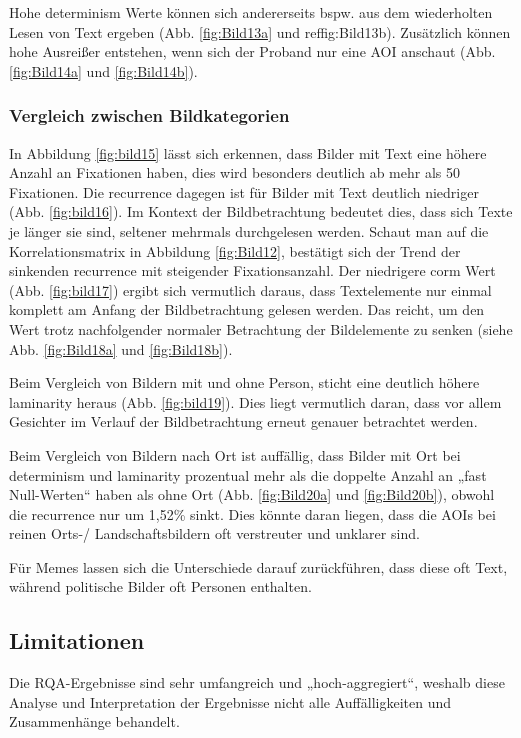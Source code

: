 \documentclass[
    language=german, %
    thesis=seminar, %
    supervisor=postdoc, %
    multiauthor=true, %
    ]{settings/csssa-thesis}
\begin{document}
Hohe determinism Werte können sich andererseits bspw. 
aus dem wiederholten Lesen von Text ergeben (Abb. \ref{fig:Bild13a} und ref{fig:Bild13b}). 
Zusätzlich können hohe Ausreißer entstehen, wenn sich der Proband nur eine AOI anschaut (Abb. \ref{fig:Bild14a} und \ref{fig:Bild14b}). 

\subsubsection{Vergleich zwischen Bildkategorien}
In Abbildung \ref{fig:bild15} lässt sich erkennen, dass Bilder mit Text eine höhere Anzahl an Fixationen haben, 
dies wird besonders deutlich ab mehr als 50 Fixationen. 
Die recurrence dagegen ist für Bilder mit Text deutlich niedriger (Abb. \ref{fig:bild16}). 
Im Kontext der Bildbetrachtung bedeutet dies, dass sich Texte je länger sie sind, 
seltener mehrmals durchgelesen werden.  Schaut man auf die Korrelationsmatrix in Abbildung \ref{fig:Bild12}, 
bestätigt sich der Trend der sinkenden recurrence mit steigender Fixationsanzahl. 
Der niedrigere corm Wert (Abb. \ref{fig:bild17}) ergibt sich vermutlich daraus, dass Textelemente 
nur einmal komplett am Anfang der Bildbetrachtung gelesen werden. Das reicht, 
um den Wert trotz nachfolgender normaler Betrachtung der Bildelemente zu senken (siehe Abb. \ref{fig:Bild18a} und \ref{fig:Bild18b}). 

Beim Vergleich von Bildern mit und ohne Person, sticht eine deutlich höhere laminarity heraus (Abb. \ref{fig:bild19}). 
Dies liegt vermutlich daran, dass vor allem Gesichter im Verlauf der Bildbetrachtung erneut genauer betrachtet werden. 

Beim Vergleich von Bildern nach Ort ist auffällig, dass Bilder mit Ort bei determinism und laminarity 
prozentual mehr als die doppelte Anzahl an „fast Null-Werten“ haben als ohne Ort (Abb. \ref{fig:Bild20a} und \ref{fig:Bild20b}), 
obwohl die recurrence nur um 1,52\% sinkt. Dies könnte daran liegen, dass die AOIs bei reinen 
Orts-/ Landschaftsbildern oft verstreuter und unklarer sind. 

Für Memes lassen sich die Unterschiede darauf zurückführen, dass diese oft Text, während politische Bilder oft Personen enthalten.  

\subsection{Limitationen}
Die RQA-Ergebnisse sind sehr umfangreich und „hoch-aggregiert“, weshalb diese Analyse und 
Interpretation der Ergebnisse nicht alle Auffälligkeiten und Zusammenhänge behandelt. 
\end{document}
